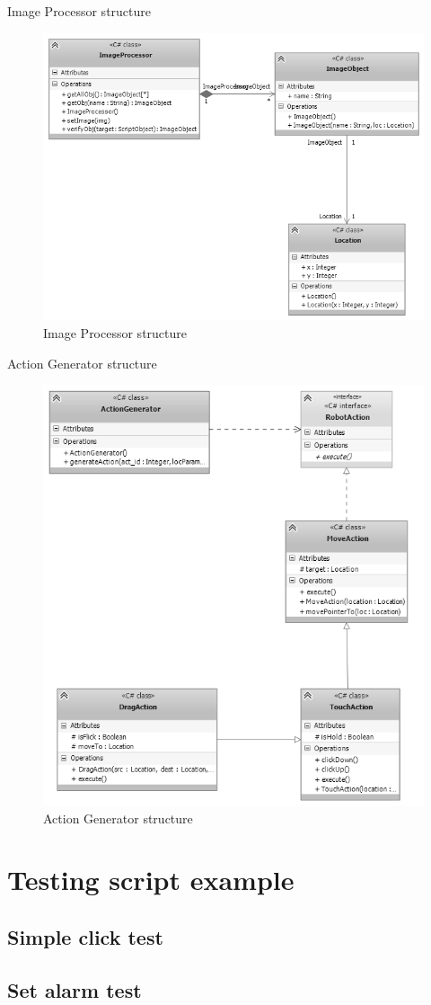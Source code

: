 Image Processor structure
	\begin{figure}[H]
		\centering
		\includegraphics[scale=0.75]{Chapters/Fig/img_processor.png}
		\caption{Image Processor structure}
		\label{fig:img_processor}
	\end{figure}

Action Generator structure
	\begin{figure}[H]
		\centering
		\includegraphics[scale=0.75]{Chapters/Fig/act_gen.png}
		\caption{Action Generator structure}
		\label{fig:act_gen}
	\end{figure}

\section{Testing script example}
\subsection{Simple click test}

\subsection{Set alarm test}